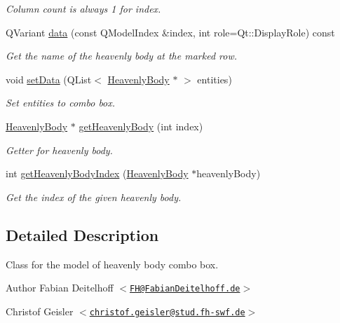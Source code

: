 \begin{DoxyCompactItemize}
\begin{DoxyCompactList}\small\item\em \-Column count is always 1 for index. \end{DoxyCompactList}\item 
\-Q\-Variant \hyperlink{classHeavenlyBodyComboBoxModel_ab32452909de0e4238d357fe183759583}{data} (const \-Q\-Model\-Index \&index, int role=\-Qt\-::\-Display\-Role) const 
\begin{DoxyCompactList}\small\item\em \-Get the name of the heavenly body at the marked row. \end{DoxyCompactList}\item 
void \hyperlink{classHeavenlyBodyComboBoxModel_a7d7afd44d28fc5fb9d7c99a2295f81e7}{set\-Data} (\-Q\-List$<$ \hyperlink{classHeavenlyBody}{\-Heavenly\-Body} $\ast$ $>$ entities)
\begin{DoxyCompactList}\small\item\em \-Set entities to combo box. \end{DoxyCompactList}\item 
\hyperlink{classHeavenlyBody}{\-Heavenly\-Body} $\ast$ \hyperlink{classHeavenlyBodyComboBoxModel_a5ab4dae7941519612bcbcc7e1b6463eb}{get\-Heavenly\-Body} (int index)
\begin{DoxyCompactList}\small\item\em \-Getter for heavenly body. \end{DoxyCompactList}\item 
int \hyperlink{classHeavenlyBodyComboBoxModel_ac57200d9257538babfdb200a0a661dd3}{get\-Heavenly\-Body\-Index} (\hyperlink{classHeavenlyBody}{\-Heavenly\-Body} $\ast$heavenly\-Body)
\begin{DoxyCompactList}\small\item\em \-Get the index of the given heavenly body. \end{DoxyCompactList}\end{DoxyCompactItemize}


\subsection{\-Detailed \-Description}
\-Class for the model of heavenly body combo box.

\begin{DoxyAuthor}{\-Author}
\-Fabian \-Deitelhoff $<$\href{mailto:FH@FabianDeitelhoff.de}{\tt \-F\-H@\-Fabian\-Deitelhoff.\-de}$>$ 

\-Christof \-Geisler $<$\href{mailto:christof.geisler@stud.fh-swf.de}{\tt christof.\-geisler@stud.\-fh-\/swf.\-de}$>$ 
\end{DoxyAuthor}


